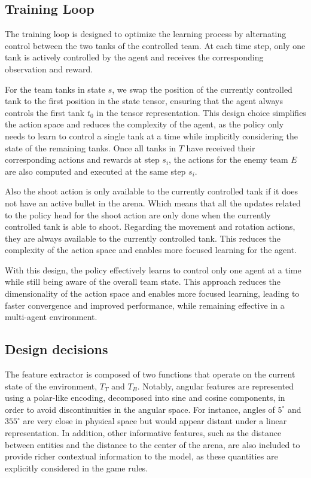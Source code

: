 \documentclass[conf]{new-aiaa}
\begin{document}
\subsection{Training Loop}
The training loop is designed to optimize the learning process by alternating control between the two tanks of the controlled team. At each time step, only one tank is actively controlled by the agent and receives the corresponding observation and reward.

For the team tanks in state $s$, we swap the position of the currently controlled tank to the first position in the state tensor, ensuring that the agent always controls the first tank $t_0$ in the tensor representation. This design choice simplifies the action space and reduces the complexity of the agent, as the policy only needs to learn to control a single tank at a time while implicitly considering the state of the remaining tanks. Once all tanks in $T$ have received their corresponding actions and rewards at step $s_i$, the actions for the enemy team $E$ are also computed and executed at the same step $s_i$.

Also the shoot action is only available to the currently controlled tank if it does not have an active bullet in the arena. Which means that all the updates related to the policy head for the shoot action are only done when the currently controlled tank is able to shoot. Regarding the movement and rotation actions, they are always available to the currently controlled tank. This reduces the complexity of the action space and enables more focused learning for the agent.

With this design, the policy effectively learns to control only one agent at a time while still being aware of the overall team state. This approach reduces the dimensionality of the action space and enables more focused learning, leading to faster convergence and improved performance, while remaining effective in a multi-agent environment.

\subsection{Design decisions}

The feature extractor is composed of two functions that operate on the current state of the environment, $T_T$ and $T_B$. Notably, angular features are represented using a polar-like encoding, decomposed into sine and cosine components, in order to avoid discontinuities in the angular space. For instance, angles of $5^\circ$ and $355^\circ$ are very close in physical space but would appear distant under a linear representation. In addition, other informative features, such as the distance between entities and the distance to the center of the arena, are also included to provide richer contextual information to the model, as these quantities are explicitly considered in the game rules.
\end{document}
